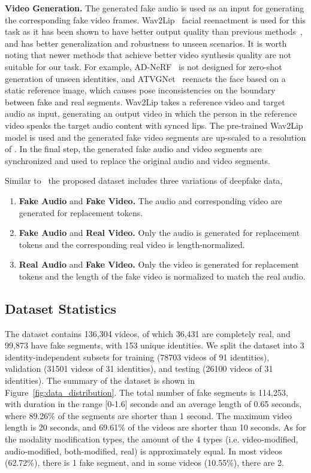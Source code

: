 \documentclass[conference, a4paper]{IEEEtran}
\makeatletter
\newcommand*{\ie}{i.e.\@\xspace}
\makeatother
\begin{document}
\noindent \textbf{Video Generation.} The generated fake audio is used as an input for generating the corresponding fake video frames. Wav2Lip~\cite{prajwal_lip_2020} facial reenactment is used for this task as it has been shown to have better output quality than previous methods~\cite{jamaludin_you_2019, k_r_towards_2019}, and has better generalization and robustness to unseen scenarios. It is worth noting that newer methods that achieve better video synthesis quality are not suitable for our task. For example, AD-NeRF~\cite{guo_ad-nerf_2021} is not designed for zero-shot generation of unseen identities, and ATVGNet~\cite{chen_hierarchical_2019} reenacts the face based on a static reference image, which causes pose inconsistencies on the boundary between fake and real segments. Wav2Lip takes a reference video and target audio as input, generating an output video in which the person in the reference video speaks the target audio content with synced lips. The pre-trained Wav2Lip model is used and the generated fake video segments are up-scaled to a resolution of . In the final step, the generated fake audio and video segments are synchronized and used to replace the original audio and video segments.

Similar to~\cite{khalid_evaluation_2021} the proposed dataset includes three variations of deepfake data,

\begin{enumerate}
\item{\textbf{Fake Audio} and \textbf{Fake Video.} The audio and corresponding video are generated for replacement tokens.}
\item{\textbf{Fake Audio} and \textbf{Real Video.} Only the audio is generated for replacement tokens and the corresponding real video is length-normalized.}
\item{\textbf{Real Audio} and \textbf{Fake Video.} Only the video is generated for replacement tokens and the length of the fake video is normalized to match the real audio.}
\end{enumerate}

\subsection{Dataset Statistics}
The dataset contains 136,304 videos, of which 36,431 are completely real, and 99,873 have fake segments, with 153 unique identities. We split the dataset into 3 identity-independent subsets for training (78703 videos of 91 identities), validation (31501 videos of 31 identities), and testing (26100 videos of 31 identities). The summary of the dataset is shown in Figure~\ref{fig:data_distribution}. The total number of fake segments is 114,253, with duration in the range [0-1.6] seconds and an average length of 0.65 seconds, where 89.26\% of the segments are shorter than 1 second. The maximum video length is 20 seconds, and 69.61\% of the videos are shorter than 10 seconds. As for the modality modification types, the amount of the 4 types (\ie video-modified, audio-modified, both-modified, real) is approximately equal. In most videos (62.72\%), there is 1 fake segment, and in some videos (10.55\%), there are 2. 
\end{document}
